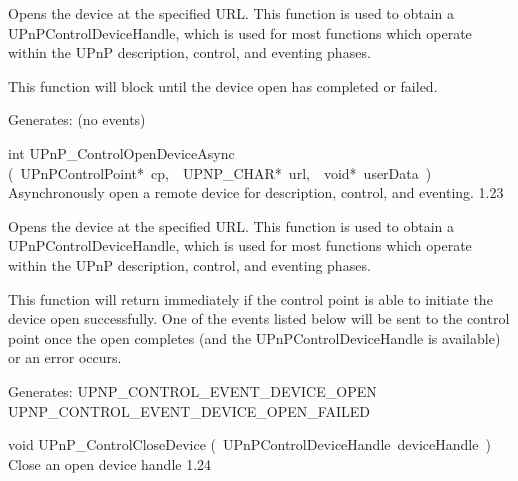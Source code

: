 \documentclass{article}
\begin{document}
\begin{cxxentry}
\begin{cxxfunction}
\begin{cxxdoc}
Opens the device at the specified URL.  This function is used to
obtain a UPnPControlDeviceHandle, which is used for most functions
which operate within the UPnP description, control, and eventing
phases.

This function will block until the device open has completed or failed.

Generates:
(no events)


\end{cxxdoc}
\end{cxxfunction}
\begin{cxxfunction}
{int}
        {UPnP\_ControlOpenDeviceAsync}
        {(\ UPnPControlPoint*\ cp,\ \ UPNP\_CHAR*\ url,\ \ void*\ userData\ )}
        {Asynchronously open a remote device for description, control, and eventing. }
        {1.23}
\begin{cxxdoc}

Opens the device at the specified URL.  This function is used to
obtain a UPnPControlDeviceHandle, which is used for most functions
which operate within the UPnP description, control, and eventing
phases.

This function will return immediately if the control point is able to
initiate the device open successfully.  One of the events listed
below will be sent to the control point once the open completes (and
the UPnPControlDeviceHandle is available) or an error occurs.

Generates:
UPNP\_CONTROL\_EVENT\_DEVICE\_OPEN
UPNP\_CONTROL\_EVENT\_DEVICE\_OPEN\_FAILED


\end{cxxdoc}
\end{cxxfunction}
\begin{cxxfunction}
{void}
        {UPnP\_ControlCloseDevice}
        {(\ UPnPControlDeviceHandle\ deviceHandle\ )}
        {Close an open device handle }
        {1.24}
\begin{cxxdoc}


\end{cxxdoc}
\end{cxxfunction}
\end{cxxentry}
\end{document}
